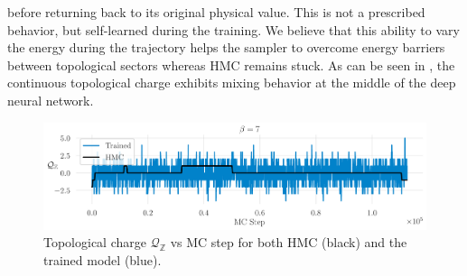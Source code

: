 \documentclass{article} %
\begin{document}
before returning back to its original physical value.  This is not a prescribed behavior, but self-learned during the
training.
%
We believe that this ability to vary the energy during the trajectory helps the sampler to overcome energy barriers
between topological sectors whereas HMC remains stuck.
%
As can be seen in , the continuous topological charge exhibits mixing behavior at the middle of the
deep neural network.
%
\begin{figure}[htpb]
   \centering
   \includegraphics[width=\textwidth]{figures/topological_freezing_anl_blue_wide.pdf}
   \caption{\label{fig:topfreeze}Topological charge \(\mathcal{Q}_{\mathbb{Z}}\) vs MC
   step for both HMC (black) and the trained model (blue).}
\end{figure}
%
\end{document}

